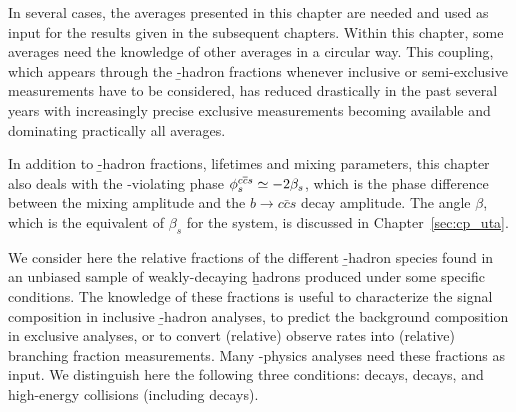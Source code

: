In several cases, the averages presented in this chapter are 
needed and used as input for the results given in the subsequent chapters. 
Within this chapter, some averages need the knowledge of other 
averages in a circular way. This coupling, which appears through the 
\b-hadron fractions whenever inclusive or semi-exclusive measurements 
have to be considered, has reduced drastically in the past several years 
with increasingly precise exclusive measurements becoming available
and dominating practically all averages. 

In addition to \b-hadron fractions, lifetimes and 
mixing parameters, this chapter also deals with the 
\CP-violating phase $\phiccbars\simeq -2\beta_s$, which is the phase 
difference between the \Bs mixing amplitude and the 
$b\to c\bar{c}s$ decay amplitude. The angle $\beta$, 
which is the equivalent of $\beta_s$ for the \Bd 
system, is discussed in Chapter~\ref{sec:cp_uta}. 

 
We consider here the relative fractions of the different \b-hadron 
species found in an unbiased sample of weakly-decaying \b hadrons 
produced under some specific conditions. The knowledge of these fractions
is useful to characterize the signal composition in inclusive \b-hadron 
analyses, to predict the background composition in exclusive analyses, 
or to convert (relative) observe rates into (relative) branching fraction 
measurements. 
Many \B-physics analyses need these fractions as input. We distinguish 
here the following three conditions: \Ups decays, \Upsfive decays, and 
high-energy collisions (including \Z decays). 



